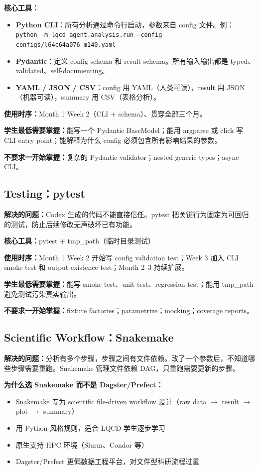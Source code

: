 \documentclass[11pt,a4paper,fontset=fandol]{ctexart}
\begin{document}
\textbf{核心工具：}
\begin{itemize}
  \item \textbf{Python CLI}：所有分析通过命令行启动，参数来自 config 文件。例：\texttt{python -m lqcd\_agent.analysis.run --config configs/l64c64a076\_m140.yaml}
  \item \textbf{Pydantic}：定义 config schema 和 result schema。所有输入输出都是 typed、validated、self-documenting。
  \item \textbf{YAML / JSON / CSV}：config 用 YAML（人类可读），result 用 JSON（机器可读），summary 用 CSV（表格分析）。
\end{itemize}

\textbf{使用时序：}Month 1 Week 2（CLI + schema）、贯穿全部三个月。

\textbf{学生最低需要掌握：}能写一个 Pydantic BaseModel；能用 argparse 或 click 写 CLI entry point；能解释为什么 config 必须包含所有影响结果的参数。

\textbf{不要求一开始掌握：}复杂的 Pydantic validator；nested generic types；async CLI。

\subsection{Testing：pytest}

\textbf{解决的问题：}Codex 生成的代码不能直接信任。pytest 把关键行为固定为可回归的测试，防止后续修改无声破坏已有功能。

\textbf{核心工具：}pytest + tmp\_path（临时目录测试）

\textbf{使用时序：}Month 1 Week 2 开始写 config validation test；Week 3 加入 CLI smoke test 和 output existence test；Month 2--3 持续扩展。

\textbf{学生最低需要掌握：}能写 smoke test、unit test、regression test；能用 tmp\_path 避免测试污染真实输出。

\textbf{不要求一开始掌握：}fixture factories；parametrize；mocking；coverage reports。

\subsection{Scientific Workflow：Snakemake}

\textbf{解决的问题：}分析有多个步骤，步骤之间有文件依赖。改了一个参数后，不知道哪些步骤需要重跑。Snakemake 管理文件依赖 DAG，只重跑需要更新的步骤。

\textbf{为什么选 Snakemake 而不是 Dagster/Prefect：}
\begin{itemize}
  \item Snakemake 专为 scientific file-driven workflow 设计（raw data $\to$ result $\to$ plot $\to$ summary）
  \item 用 Python 风格规则，适合 LQCD 学生逐步学习
  \item 原生支持 HPC 环境（Slurm、Condor 等）
  \item Dagster/Prefect 更偏数据工程平台，对文件型科研流程过重
\end{itemize}
\end{document}
